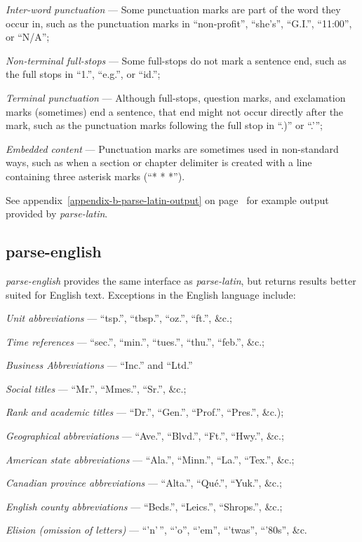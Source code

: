 \begin{aenumerate}
\item\emph{Inter-word punctuation} --- Some punctuation marks are part of
  the word they occur in, such as the punctuation marks in ``non-profit'',
  ``she's'', ``G.I.'', ``11:00'', or ``N\slash A'';
\item\emph{Non-terminal full-stops} --- Some full-stops do not mark a
  sentence end, such as the full stops in ``1.'', ``e.g.'', or ``id.'';
\item\emph{Terminal punctuation} --- Although full-stops, question marks,
  and exclamation marks (sometimes) end a sentence, that end might not occur
  directly after the mark, such as the punctuation marks following the
  full stop in ``.)'' or ``.'{}'';
\item\emph{Embedded content} --- Punctuation marks are sometimes used in
  non-standard ways, such as when a section or chapter delimiter is
  created with a line containing three asterisk marks (``* * *'').
\end{aenumerate}


See appendix~\ref{appendix-b-parse-latin-output} on
page~\pageref{appendix-b-parse-latin-output} for example output provided
by \emph{parse-latin}.

\subsection{parse-english}\label{parse-english}

\emph{parse-english} provides the same interface as \emph{parse-latin}, but
returns results better suited for English text.
Exceptions in the English language include:

\begin{aenumerate}
\item \emph{Unit abbreviations} --- ``tsp.'', ``tbsp.'', ``oz.'', ``ft.'',
  \&c.;
\item\emph{Time references} --- ``sec.'', ``min.'', ``tues.'', ``thu.'',
  ``feb.'', \&c.;
\item\emph{Business Abbreviations} --- ``Inc.'' and ``Ltd.''
\item\emph{Social titles} --- ``Mr.'', ``Mmes.'', ``Sr.'', \&c.;
\item\emph{Rank and academic titles} --- ``Dr.'', ``Gen.'', ``Prof.'',
  ``Pres.'', \&c.);
\item\emph{Geographical abbreviations} --- ``Ave.'', ``Blvd.'', ``Ft.'',
  ``Hwy.'', \&c.;
\item\emph{American state abbreviations} --- ``Ala.'', ``Minn.'', ``La.'',
  ``Tex.'', \&c.;
\item\emph{Canadian province abbreviations} --- ``Alta.'', ``Qué.'',
  ``Yuk.'', \&c.;
\item\emph{English county abbreviations} --- ``Beds.'', ``Leics.'',
  ``Shrops.'', \&c.;
\item\emph{Elision (omission of letters)} --- ``'n'\,'', ``'o'', ``'em'',
  ``'twas'', ``'80s'', \&c.
\end{aenumerate}

